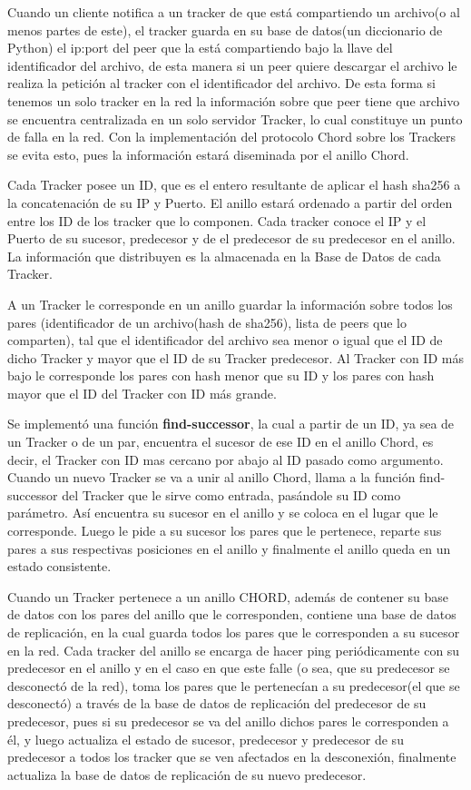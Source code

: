 \documentclass[article]{llncs}
\begin{document}
Cuando un cliente notifica a un tracker de que está compartiendo un archivo(o al menos partes de este), el tracker 
guarda en su base de datos(un diccionario de Python) el ip:port del peer que la está compartiendo bajo la llave del identificador del archivo, de esta manera 
si un peer quiere descargar el archivo le realiza la petición al tracker con el identificador del archivo. De esta forma 
si tenemos un solo tracker en la red la información sobre que peer tiene que archivo se encuentra centralizada en un solo servidor 
Tracker, lo cual constituye un punto de falla en la red. Con la implementación del protocolo Chord sobre los Trackers se evita esto, 
pues la información estará diseminada por el anillo Chord. 

Cada Tracker posee un ID, que es el entero resultante de aplicar el hash sha256 a la concatenación de su IP y Puerto. El anillo estará ordenado 
a partir del orden entre los ID de los tracker que lo componen. Cada tracker conoce  el IP y el Puerto de su sucesor, predecesor y de el predecesor 
de su predecesor en el anillo. La información que distribuyen es la almacenada en la Base de Datos de cada Tracker.

A un Tracker le corresponde en un anillo guardar la información sobre todos los pares (identificador de un archivo(hash de sha256), lista de peers que 
lo comparten), tal que el identificador del archivo sea menor o igual que el ID de dicho Tracker y mayor que el ID de su Tracker predecesor. 
Al Tracker con ID más bajo le corresponde los pares con hash menor que su ID y los pares con hash mayor que el ID del Tracker con ID más grande.

Se implementó una función \textbf{find-successor}, la cual a partir de un ID, ya sea de un Tracker o de un par, encuentra el sucesor 
de ese ID en el anillo Chord, es decir, el Tracker con ID mas cercano por abajo al ID pasado como argumento. Cuando un nuevo 
Tracker se va a unir al anillo Chord, llama a la función find-successor del Tracker que le sirve como entrada, pasándole su ID 
como parámetro. Así encuentra su sucesor en el anillo y se coloca en el lugar que le corresponde. Luego le pide a su 
sucesor los pares que le pertenece, reparte sus pares a sus respectivas posiciones en el anillo y finalmente el anillo queda en un estado consistente.

Cuando un Tracker pertenece a un anillo CHORD, además de contener su base de datos con los pares del anillo que le corresponden, contiene una 
base de datos de replicación, en la cual guarda todos los pares que le corresponden a su sucesor en la red. Cada tracker del anillo se encarga de hacer 
ping periódicamente con su predecesor en el anillo y en el caso en que este falle (o sea, que su predecesor se desconectó de la red), toma 
los pares que le pertenecían a su predecesor(el que se desconectó) a través de la base de datos de replicación del predecesor de su predecesor, pues si su predecesor 
se va del anillo dichos pares le corresponden a él, y luego actualiza el estado de sucesor, predecesor y predecesor de su predecesor a todos los tracker que se ven 
afectados en la desconexión, finalmente actualiza la base de datos de replicación de su nuevo predecesor.
\end{document}
